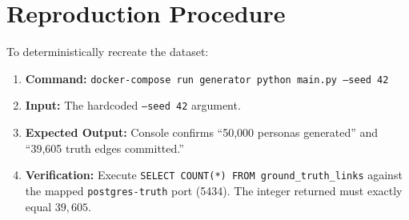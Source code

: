 \begin{table}[h]
\centering
{}
\caption{Canonical Record Field Definitions}
\label{tab:app-canonical-schema}
\end{table}

\section{Reproduction Procedure}
\label{app-sec:repro-procedure}
To deterministically recreate the dataset:
\begin{enumerate}
    \item \textbf{Command:} \texttt{docker-compose run generator python main.py --seed 42}
    \item \textbf{Input:} The hardcoded \texttt{--seed 42} argument.
    \item \textbf{Expected Output:} Console confirms ``50,000 personas generated'' and ``39,605 truth edges committed.''
    \item \textbf{Verification:} Execute \texttt{SELECT COUNT(*) FROM ground\_truth\_links} against the mapped \texttt{postgres-truth} port (5434). The integer returned must exactly equal $39,605$.
\end{enumerate}
